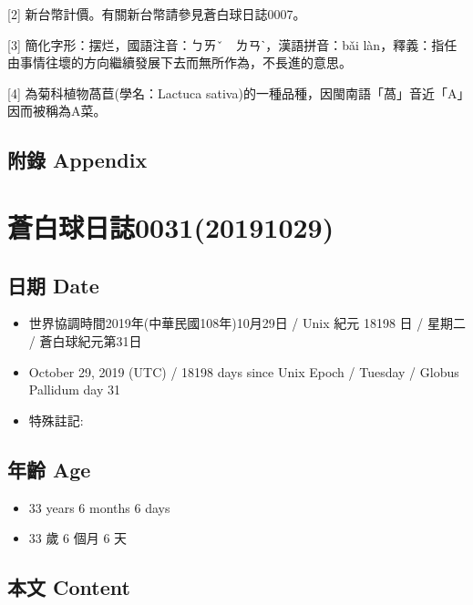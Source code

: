 \documentclass[a5paper, 12pt
]{book}
\providecommand{\tightlist}{%
  \setlength{\itemsep}{0pt}\setlength{\parskip}{0pt}}
\begin{document}
{[}2{]} 新台幣計價。有關新台幣請參見蒼白球日誌0007。

{[}3{]} 簡化字形：摆烂，國語注音：ㄅㄞˇ　ㄌㄢˋ，漢語拼音：bǎi
làn，釋義：指任由事情往壞的方向繼續發展下去而無所作為，不長進的意思。

{[}4{]} 為菊科植物萵苣(學名：Lactuca
sativa)的一種品種，因閩南語「萵」音近「A」因而被稱為A菜。

\hypertarget{ux9644ux9304-appendix-22}{%
\subsection{附錄 Appendix}\label{ux9644ux9304-appendix-22}}

\hypertarget{ux84bcux767dux7403ux65e5ux8a8c003120191029}{%
\section{蒼白球日誌0031(20191029)}\label{ux84bcux767dux7403ux65e5ux8a8c003120191029}}

\hypertarget{ux65e5ux671f-date-30}{%
\subsection{日期 Date}\label{ux65e5ux671f-date-30}}

\begin{itemize}
\tightlist
\item
  世界協調時間2019年(中華民國108年)10月29日 / Unix 紀元 18198 日 /
  星期二 / 蒼白球紀元第31日
\item
  October 29, 2019 (UTC) / 18198 days since Unix Epoch / Tuesday /
  Globus Pallidum day 31
\item
  特殊註記:
\end{itemize}

\hypertarget{ux5e74ux9f61-age-30}{%
\subsection{年齡 Age}\label{ux5e74ux9f61-age-30}}

\begin{itemize}
\tightlist
\item
  33 years 6 months 6 days
\item
  33 歲 6 個月 6 天
\end{itemize}

\hypertarget{ux672cux6587-content-30}{%
\subsection{本文 Content}\label{ux672cux6587-content-30}}
\end{document}
